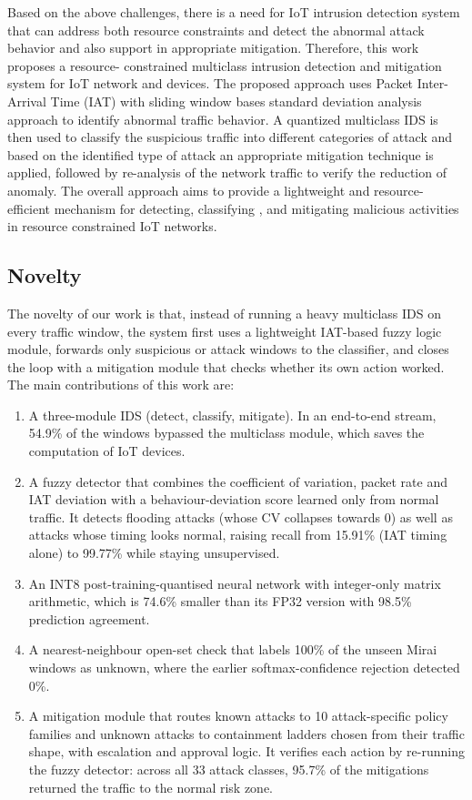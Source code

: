 \documentclass[]{interact}
\theoremstyle{plain}%
\theoremstyle{definition}
\theoremstyle{remark}
\begin{document}
Based on the above challenges, there is a need for IoT intrusion detection system that can address both resource constraints and detect the abnormal attack behavior and also support in appropriate mitigation.\cite{heidari2023internet} Therefore, this work proposes a resource- constrained multiclass intrusion detection and mitigation system for IoT network and devices. The proposed approach uses Packet Inter-Arrival Time (IAT) with sliding window bases standard deviation analysis approach to identify abnormal traffic behavior. A quantized multiclass IDS is then used to classify the suspicious traffic into different categories of attack and based on the identified type of attack an appropriate mitigation technique is applied\cite{mondal2026quantized}, followed by re-analysis of the network traffic to verify the reduction of anomaly. The overall approach aims to provide a lightweight and resource-efficient mechanism for detecting, classifying , and mitigating malicious activities in resource constrained IoT networks.


\subsection{Novelty}
The novelty of our work is that, instead of running a heavy multiclass IDS on every traffic window, the system first uses a lightweight IAT-based fuzzy logic module, forwards only suspicious or attack windows to the classifier, and closes the loop with a mitigation module that checks whether its own action worked. The main contributions of this work are:

\begin{enumerate}
\item A three-module IDS (detect, classify, mitigate). In an end-to-end stream, 54.9\% of the windows bypassed the multiclass module, which saves the computation of IoT devices.
\item A fuzzy detector that combines the coefficient of variation, packet rate and IAT deviation with a behaviour-deviation score learned only from normal traffic. It detects flooding attacks (whose CV collapses towards 0) as well as attacks whose timing looks normal, raising recall from 15.91\% (IAT timing alone) to 99.77\% while staying unsupervised.
\item An INT8 post-training-quantised neural network with integer-only matrix arithmetic, which is 74.6\% smaller than its FP32 version with 98.5\% prediction agreement.
\item A nearest-neighbour open-set check that labels 100\% of the unseen Mirai windows as unknown, where the earlier softmax-confidence rejection detected 0\%.
\item A mitigation module that routes known attacks to 10 attack-specific policy families and unknown attacks to containment ladders chosen from their traffic shape, with escalation and approval logic. It verifies each action by re-running the fuzzy detector: across all 33 attack classes, 95.7\% of the mitigations returned the traffic to the normal risk zone.
\end{enumerate}
\end{document}

